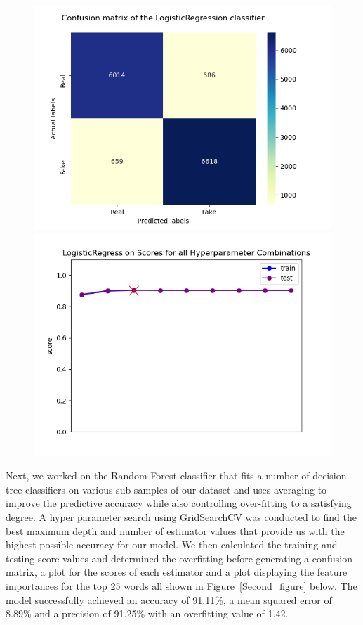 \documentclass[10pt,twocolumn,letterpaper]{article}
\begin{document}
\begin{figure}[h]
   \begin{center}
        \includegraphics[width=\linewidth]{Latex_Report/report/Graphs/LR/confusion_matrix.png}
        \includegraphics[width=\linewidth]{Latex_Report/report/Graphs/LR/scores_plot.png}
   \end{center}
        \vspace*{-5mm}
        \caption{\label{first_figure}}
\end{figure}

Next, we worked on the Random Forest classifier that fits a number of decision tree classifiers on various sub-samples of our dataset and uses averaging to improve the predictive accuracy while also controlling over-fitting to a satisfying degree. A hyper parameter search using GridSearchCV was conducted to find the best maximum depth and number of estimator values that provide us with the highest possible accuracy for our model. We then calculated the training and testing score values and determined the overfitting before generating a confusion matrix, a plot for the scores of each estimator and a plot displaying the feature importances for the top 25 words all shown in Figure~\ref{Second_figure} below. The model successfully achieved an accuracy of 91.11\%, a mean squared error of 8.89\% and a precision of 91.25\% with an overfitting value of 1.42.\\ 
\end{document}
